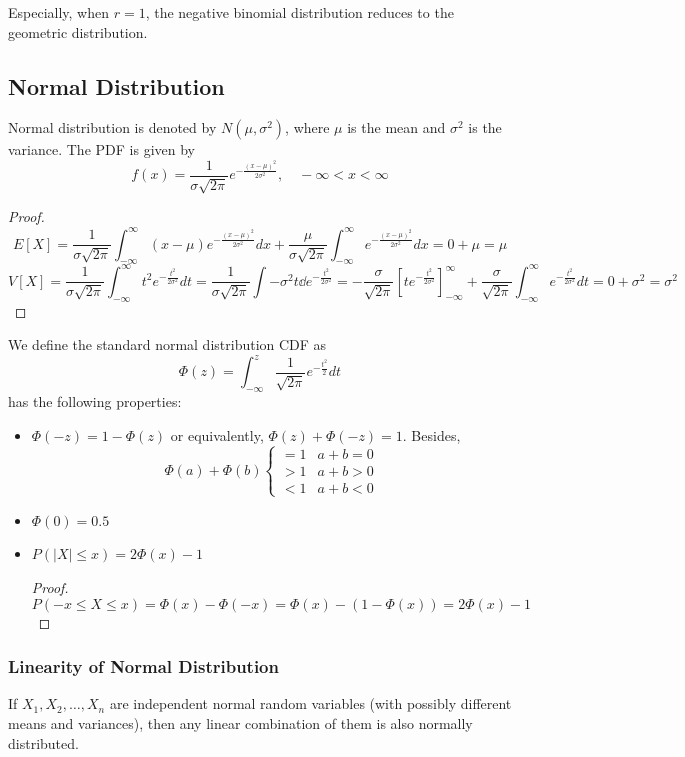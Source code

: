 \documentclass{template}
\begin{document}
Especially, when \( r=1 \), the negative binomial distribution reduces to the geometric distribution.

\subsection{Normal Distribution}
Normal distribution is denoted by \( N(\mu, \sigma^2) \), where \( \mu \) is the mean and \( \sigma^2 \) is the variance.
The PDF is given by
\[
	f(x) = \frac{1}{\sigma \sqrt{2\pi}} e^{-\frac{(x-\mu)^2}{2\sigma^2}},\quad -\infty < x < \infty
\]
\begin{proof}
	\[
		E[X] = \frac{1}{\sigma \sqrt{2\pi}} \int_{-\infty}^{\infty} (x-\mu) e^{-\frac{(x-\mu)^2}{2\sigma^2}} dx
		+ \frac{\mu}{\sigma \sqrt{2\pi}} \int_{-\infty}^{\infty} e^{-\frac{(x-\mu)^2}{2\sigma^2}} dx
		= 0 + \mu = \mu
	\] 
	\[
		V[X] = \frac{1}{\sigma \sqrt{2\pi}} \int_{-\infty}^{\infty} t^2 e^{-\frac{t^2}{2\sigma^2}} dt
		= \frac{1}{\sigma \sqrt{2\pi}} \int -\sigma^2 t \dd e^{-\frac{t^2}{2\sigma^2}} 
		= -\frac{\sigma}{\sqrt{2\pi}} \left[ t e^{-\frac{t^2}{2\sigma^2}} \right]_{-\infty}^{\infty} 
		+ \frac{\sigma}{\sqrt{2\pi}} \int_{-\infty}^{\infty} e^{-\frac{t^2}{2\sigma^2}} dt
		= 0 + \sigma^2 = \sigma^2
	\] 
\end{proof}

We define the standard normal distribution CDF as
\[
	\Phi(z) = \int_{-\infty}^{z} \frac{1}{\sqrt{2\pi}} e^{-\frac{t^2}{2}} dt
\] 
has the following properties:
\begin{itemize}
	\item $\Phi(-z) = 1 - \Phi(z)$ or equivalently, $\Phi(z) + \Phi(-z) = 1$. Besides,
		\[
			\Phi(a) + \Phi(b) 
			\begin{cases}
				=1 & a+b=0 \\
				>1 & a+b>0 \\
				<1 & a+b<0
			\end{cases}
		\] 
	\item $\Phi(0) = 0.5$
	\item $P(|X|\leq x) = 2\Phi(x) - 1$
		\begin{proof}
			\[
			P(-x\leq X \leq x) = \Phi(x) - \Phi(-x) = \Phi(x) - (1-\Phi(x)) = 2\Phi(x) - 1
			\] 
		\end{proof}
\end{itemize}

\subsubsection{Linearity of Normal Distribution}
If $X_1, X_2, \ldots, X_n$ are independent normal random variables (with possibly different means and variances), then
any linear combination of them is also normally distributed.
\end{document}
